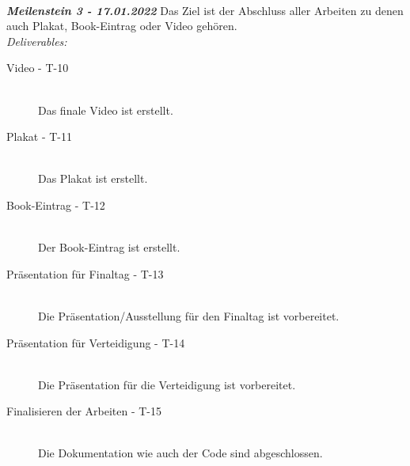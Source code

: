~\\

\textit{\textbf{Meilenstein 3 - 17.01.2022}}
Das Ziel ist der Abschluss aller Arbeiten zu denen auch Plakat, Book-Eintrag oder Video gehören.\\
\textit{Deliverables:}
\begin{description}
    \item[Video - T-10]\hfill \\
    Das finale Video ist erstellt.
    \item[Plakat - T-11]\hfill \\
    Das Plakat ist erstellt.
    \item[Book-Eintrag - T-12]\hfill \\
    Der Book-Eintrag ist erstellt.
    \item[Präsentation für Finaltag - T-13]\hfill \\
    Die Präsentation/Ausstellung für den Finaltag ist vorbereitet.
    \item[Präsentation für Verteidigung - T-14]\hfill \\
    Die Präsentation für die Verteidigung ist vorbereitet.
    \item[Finalisieren der Arbeiten - T-15]\hfill \\
    Die Dokumentation wie auch der Code sind abgeschlossen.
\end{description}



